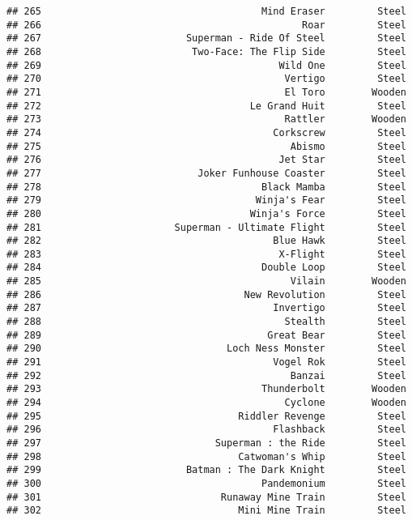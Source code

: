 \documentclass[
]{article}
\begin{document}
\begin{verbatim}
## 265                                      Mind Eraser         Steel
## 266                                             Roar         Steel
## 267                         Superman - Ride Of Steel         Steel
## 268                          Two-Face: The Flip Side         Steel
## 269                                         Wild One         Steel
## 270                                          Vertigo         Steel
## 271                                          El Toro        Wooden
## 272                                    Le Grand Huit         Steel
## 273                                          Rattler        Wooden
## 274                                        Corkscrew         Steel
## 275                                           Abismo         Steel
## 276                                         Jet Star         Steel
## 277                           Joker Funhouse Coaster         Steel
## 278                                      Black Mamba         Steel
## 279                                     Winja's Fear         Steel
## 280                                    Winja's Force         Steel
## 281                       Superman - Ultimate Flight         Steel
## 282                                        Blue Hawk         Steel
## 283                                         X-Flight         Steel
## 284                                      Double Loop         Steel
## 285                                           Vilain        Wooden
## 286                                   New Revolution         Steel
## 287                                        Invertigo         Steel
## 288                                          Stealth         Steel
## 289                                       Great Bear         Steel
## 290                                Loch Ness Monster         Steel
## 291                                        Vogel Rok         Steel
## 292                                           Banzai         Steel
## 293                                      Thunderbolt        Wooden
## 294                                          Cyclone        Wooden
## 295                                  Riddler Revenge         Steel
## 296                                        Flashback         Steel
## 297                              Superman : the Ride         Steel
## 298                                  Catwoman's Whip         Steel
## 299                         Batman : The Dark Knight         Steel
## 300                                      Pandemonium         Steel
## 301                               Runaway Mine Train         Steel
## 302                                  Mini Mine Train         Steel

\end{verbatim}
\end{document}
